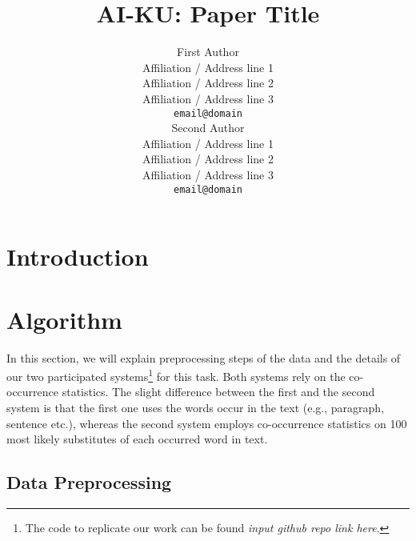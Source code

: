 \documentclass[11pt]{article}
\title{AI-KU: Paper Title}
\author{First Author \\
  Affiliation / Address line 1 \\
  Affiliation / Address line 2 \\
  Affiliation / Address line 3 \\
  {\tt email@domain} \\\And
  Second Author \\
  Affiliation / Address line 1 \\
  Affiliation / Address line 2 \\
  Affiliation / Address line 3 \\
  {\tt email@domain} \\}
\date{}
\begin{document}
\maketitle
\begin{abstract}

\end{abstract}

\section{Introduction}
\label{intro}

\begin{table*}
\caption{Contexts when using a bigram language model}
\label{tab:subs_exp}
\end{table*}

\section{Algorithm}
\label{algorithm}

In this section, we will explain preprocessing steps of the data and the details of our two participated systems\footnote{The code to replicate our work can be found \emph{input github repo link here}.} for this task. Both systems rely on the co-occurrence statistics. The slight difference between the first and the second system is that the first one uses the words occur in the text (e.g., paragraph, sentence etc.), whereas the second system employs co-occurrence statistics on 100 most likely substitutes of each occurred word in text. 

\subsection{Data Preprocessing}
\end{document}
